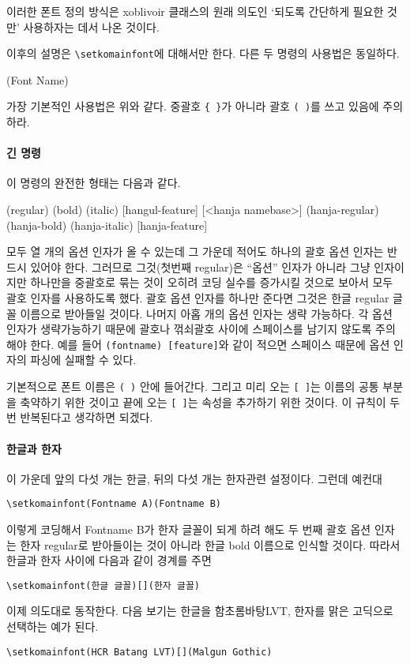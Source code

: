 \documentclass[
	12pt,
	a4paper,
	kosection,
	footnote,
	nobookmarks,
	microtype,
]{oblivoir}
\def\xetexko{\XeTeX-\ko}
\begin{document}
이러한 폰트 정의 방식은 xoblivoir 클래스의 원래 의도인 `되도록 간단하게
필요한 것만' 사용하자는 데서 나온 것이다.

이후의 설명은 \verb|\setkomainfont|에 대해서만 한다. 다른 두 명령의 사용법은 동일하다.
\begin{boxedverbatim}
\setkomainfont(Font Name)
\end{boxedverbatim}
가장 기본적인 사용법은 위와 같다. 중괄호 \verb|{ }|가 아니라 괄호 \verb|( )|를 쓰고 있음에 주의하라.

\paragraph{긴 명령}
이 명령의 완전한 형태는 다음과 같다.
\begin{boxedverbatim}
\setkomainfont[<namebase>]%
              (regular)%
              (bold)%
              (italic)%
              [hangul-feature]%
              [<hanja namebase>]%
              (hanja-regular)%
              (hanja-bold)%
              (hanja-italic)%
              [hanja-feature]
\end{boxedverbatim}
모두 열 개의 옵션 인자가 올 수 있는데 그 가운데 적어도 하나의 괄호 옵션 인자는 반드시 있어야 한다.
그러므로 그것(첫번째 regular)은 ``옵션'' 인자가 아니라 그냥 인자이지만 하나만을 중괄호로 묶는 것이 오히려 코딩 
실수를 증가시킬 것으로 보아서 모두 괄호 인자를 사용하도록 했다.
괄호 옵션 인자를 하나만 준다면 그것은 한글 regular 글꼴 이름으로 받아들일 것이다.
나머지 아홉 개의 옵션 인자는 생략 가능하다. 각 옵션 인자가 생략가능하기 때문에
괄호나 꺾쇠괄호 사이에 스페이스를 남기지 않도록 주의해야 한다. 예를 들어 \verb*|(fontname) [feature]|와 같이 
적으면 스페이스 때문에 옵션 인자의 파싱에 실패할 수 있다.

기본적으로 폰트 이름은 \verb|( )| 안에 들어간다. 그리고 미리 오는 \verb|[ ]|는 이름의 공통 부분을 축약하기 위한 것이고 끝에 오는 \verb|[ ]|는 속성을 추가하기 위한 것이다. 이 규칙이 두 번 반복된다고 생각하면 되겠다.

\paragraph{한글과 한자}
이 가운데 앞의 다섯 개는 한글, 뒤의 다섯 개는 한자관련 설정이다. 그런데 예컨대
\begin{verbatim}
\setkomainfont(Fontname A)(Fontname B)
\end{verbatim}
이렇게 코딩해서 Fontname B가 한자 글꼴이 되게 하려 해도
두 번째 괄호 옵션 인자는 한자 regular로 받아들이는 것이 아니라
한글 bold 이름으로 인식할 것이다.
따라서 한글과 한자 사이에 다음과 같이 경계를 주면
\begin{verbatim}
\setkomainfont(한글 글꼴)[](한자 글꼴)
\end{verbatim}
이제 의도대로 동작한다. 다음 보기는 한글을 함초롬바탕LVT, 한자를 맑은 고딕으로 선택하는 예가 된다.
\begin{verbatim}
\setkomainfont(HCR Batang LVT)[](Malgun Gothic)
\end{verbatim}
\end{document}
